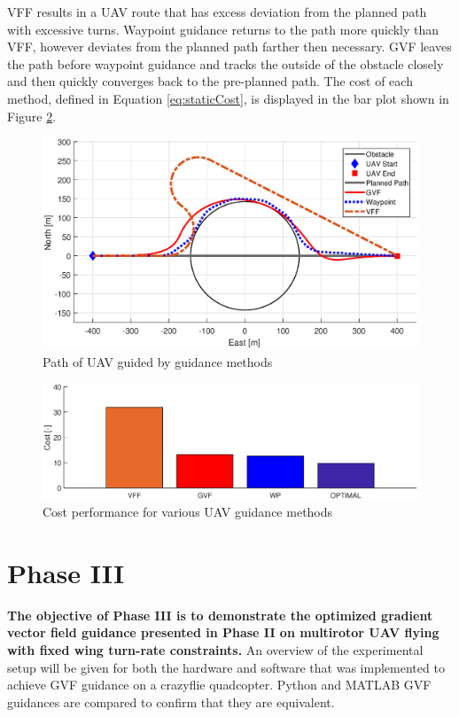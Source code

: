 \documentclass[numbered,pdftex]{ohio-etd}
\begin{document}
VFF results in a UAV route that has excess deviation from the planned path with excessive turns. Waypoint guidance returns to the path more quickly than VFF, however deviates from the planned path farther then necessary. GVF leaves the path before waypoint guidance and tracks the outside of the obstacle closely and then quickly converges back to the pre-planned path. The cost of each method, defined in Equation \ref{eq:staticCost}, is displayed in the bar plot shown in Figure \ref{fig:barplotperformance}.


\begin{figure}[H]
	\centering
	\includegraphics[trim=0 50 0 65,clip,width=15cm]{Figures/Simulations/compareMethods}
	\caption{Path of UAV guided by guidance methods}
	\label{fig:comparemethods}
\end{figure}


\begin{figure}[H]
	\centering
	\label{fig:barPlotCost}
	\includegraphics[width=15cm]{Figures/Simulations/barPlotPerformance}
	\caption{Cost performance for various UAV guidance methods}
	\label{fig:barplotperformance}
\end{figure}





\section{Phase III}
\textbf{The objective of Phase III is to demonstrate the optimized gradient vector field guidance presented in Phase II on multirotor UAV flying with fixed wing turn-rate constraints.} An overview of the experimental setup will be given for both the hardware and software that was implemented to achieve GVF guidance on a crazyflie quadcopter. Python and MATLAB GVF guidances are compared to confirm that they are equivalent.
\end{document}
